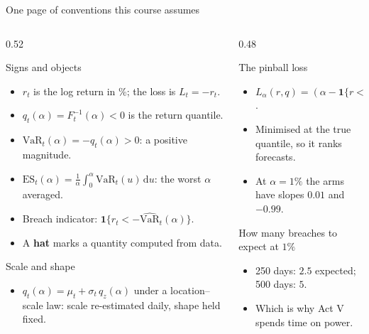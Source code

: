 \documentclass[9pt, aspectratio=169, t]{beamer}
\begin{document}
\begin{frame}{One page of conventions this course assumes}
  \begin{columns}[T]
    \begin{column}{0.52\textwidth}
      \begin{block}{Signs and objects}
        \begin{itemize}
          \item $r_t$ is the log return in \%; the loss is $L_t = -r_t$.
          \item $q_t(\alpha) = F_t^{-1}(\alpha) < 0$ is the return quantile.
          \item $\mathrm{VaR}_t(\alpha) = -q_t(\alpha) > 0$: a positive magnitude.
          \item $\mathrm{ES}_t(\alpha) = \frac{1}{\alpha}\int_{0}^{\alpha}\mathrm{VaR}_t(u)\,\mathrm{d}u$:
                the worst $\alpha$ averaged.
          \item Breach indicator: $\mathbf{1}\{r_t < -\widehat{\mathrm{VaR}}_t(\alpha)\}$.
          \item A \textbf{hat} marks a quantity computed from data.
        \end{itemize}
      \end{block}
      \begin{block}{Scale and shape}
        \begin{itemize}
          \item $q_t(\alpha) = \mu_t + \sigma_t\, q_z(\alpha)$ under a
                location--scale law: scale re-estimated daily, shape held fixed.
        \end{itemize}
      \end{block}
    \end{column}
    \begin{column}{0.48\textwidth}
      \begin{block}{The pinball loss}
        \begin{itemize}
          \item $L_\alpha(r, q) = (\alpha - \mathbf{1}\{r < q\})(r - q)$.
          \item Minimised at the true quantile, so it ranks forecasts.
          \item At $\alpha = 1\%$ the arms have slopes $0.01$ and $-0.99$.
        \end{itemize}
      \end{block}
      \begin{alertblock}{How many breaches to expect at $1\%$}
        \begin{itemize}
          \item 250 days: $2.5$ expected; 500 days: $5$.
          \item Which is why Act V spends time on power.
        \end{itemize}
      \end{alertblock}
    \end{column}
  \end{columns}
\end{frame}
\end{document}
